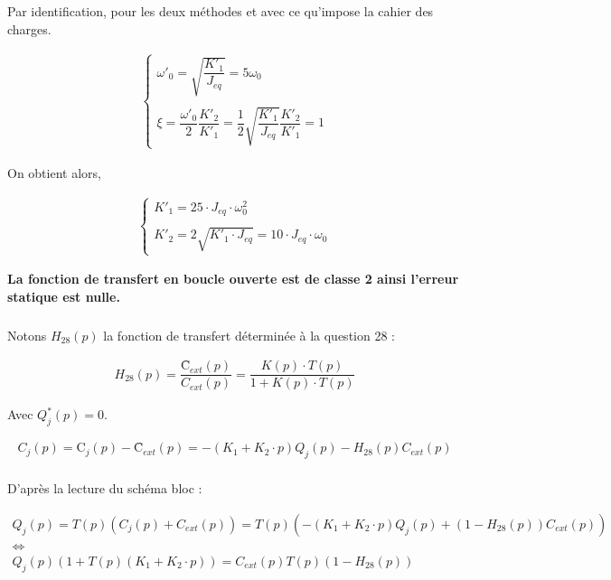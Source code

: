 \documentclass[10pt,fleqn]{article} %
\begin{document}
Par identification, pour les deux méthodes et avec ce qu'impose la cahier des charges.

\begin{align*}
\left\{
\begin{array}{c}
\omega'_0=\sqrt{\dfrac{K'_1}{J_{eq}}}=5\omega_0\\
\\
\xi=\dfrac{\omega'_0}{2}\dfrac{K'_2}{K'_1}=\dfrac{1}{2}\sqrt{\dfrac{K'_1}{J_{eq}}}\dfrac{K'_2}{K'_1}=1
\end{array}
\right.
\end{align*}

On obtient alors,

\begin{align*}
\left\{
\begin{array}{c}
K'_1=25\cdot J_{eq}\cdot \omega_0^2\\
\\
K'_2=2\sqrt{K'_1\cdot J_{eq}}=10\cdot J_{eq}\cdot \omega_0
\end{array}
\right.
\end{align*}

\textbf{La fonction de transfert en boucle ouverte est de classe 2 ainsi l'erreur statique est nulle. }

\subparagraph{}%

Notons $H_{28}(p)$ la fonction de transfert déterminée à la question 28 : 

\begin{align*}
H_{28}(p)=\dfrac{\text{\^{C}}_{ext}(p)}{C_{ext}(p)}=\dfrac{K(p)\cdot T(p)}{1+K(p)\cdot T(p)}
\end{align*}

Avec $Q^*_j(p)=0$.

\begin{align*}
C_j(p)=\text{\~{C}}_j(p)-\text{\^{C}}_{ext}(p)=-\left(K_1+K_2\cdot p\right)Q_j(p)-H_{28}(p)C_{ext}(p)\\
\end{align*}

D'après la lecture du schéma bloc : 

\begin{align*}
Q_j(p)=T(p)\left(C_j(p)+C_{ext}(p)\right)=T(p)\left(-\left(K_1+K_2\cdot p\right)Q_j(p)+\left(1-H_{28}(p)\right)C_{ext}(p)\right)\\
\Leftrightarrow\\
Q_j(p)\left(1+T(p)\left(K_1+K_2\cdot p\right)\right)=C_{ext}(p)T(p)\left(1-H_{28}(p)\right)\\
\end{align*}
\end{document}
